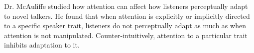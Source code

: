 Dr. McAuliffe studied how attention can affect how listeners perceptually adapt to novel talkers.
He found that when attention is explicitly or implicitly directed to a  specific speaker trait, listeners
do not perceptually adapt as much as when attention is not manipulated.
Counter-intuitively, attention to a particular trait inhibits adaptation to it.
